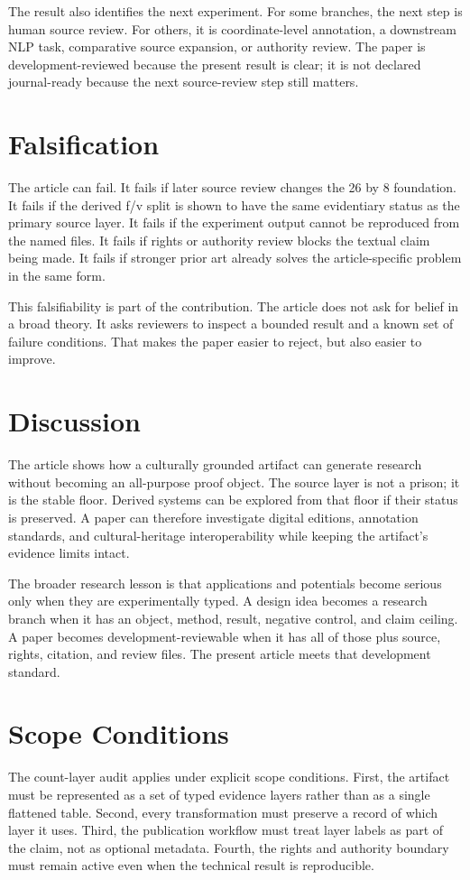 \documentclass[sigconf,nonacm]{acmart}
\begin{document}
The result also identifies the next experiment. For some branches, the next step
is human source review. For others, it is coordinate-level annotation, a
downstream NLP task, comparative source expansion, or authority review. The
paper is development-reviewed because the present result is clear; it is not
declared journal-ready because the next source-review step still matters.

\section{Falsification}
The article can fail. It fails if later source review changes the 26 by 8
foundation. It fails if the derived f/v split is shown to have the same
evidentiary status as the primary source layer. It fails if the experiment output
cannot be reproduced from the named files. It fails if rights or authority review
blocks the textual claim being made. It fails if stronger prior art already
solves the article-specific problem in the same form.

This falsifiability is part of the contribution. The article does not ask for
belief in a broad theory. It asks reviewers to inspect a bounded result and a
known set of failure conditions. That makes the paper easier to reject, but also
easier to improve.

\section{Discussion}
The article shows how a culturally grounded artifact can generate research
without becoming an all-purpose proof object. The source layer is not a prison;
it is the stable floor. Derived systems can be explored from that floor if their
status is preserved. A paper can therefore investigate digital editions, annotation standards, and cultural-heritage interoperability while keeping the
artifact's evidence limits intact.

The broader research lesson is that applications and potentials become serious
only when they are experimentally typed. A design idea becomes a research branch
when it has an object, method, result, negative control, and claim ceiling. A
paper becomes development-reviewable when it has all of those plus source,
rights, citation, and review files. The present article meets that development
standard.


\section{Scope Conditions}
The count-layer audit applies under explicit scope conditions. First, the artifact must be
represented as a set of typed evidence layers rather than as a single flattened
table. Second, every transformation must preserve a record of which layer it
uses. Third, the publication workflow must treat layer labels as part of the
claim, not as optional metadata. Fourth, the rights and authority boundary must
remain active even when the technical result is reproducible.
\end{document}
